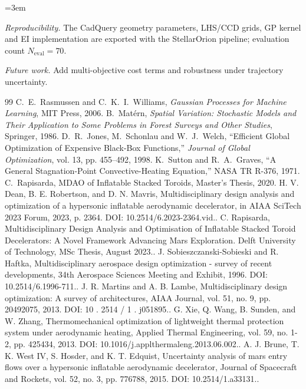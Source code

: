 \documentclass[10pt]{article}
\begin{document}
\begin{sloppypar} \emergencystretch=3em \raggedright
\noindent\textit{Reproducibility.} The CadQuery geometry parameters, LHS/CCD grids, GP kernel and EI implementation are exported with the StellarOrion pipeline; evaluation count $N_{\mathrm{eval}}=70$.\par\vspace{0.5em}
\noindent\textit{Future work.} Add multi-objective cost terms and robustness under trajectory uncertainty.\par\vspace{0.3em}
\begin{thebibliography}{99}
 C.~E.~Rasmussen and C.~K.~I.~Williams, \emph{Gaussian Processes for Machine Learning}, MIT Press, 2006.
 B.~Mat\'ern, \emph{Spatial Variation: Stochastic Models and Their Application to Some Problems in Forest Surveys and Other Studies}, Springer, 1986.
 D.~R.~Jones, M.~Schonlau and W.~J.~Welch, ``Efficient Global Optimization of Expensive Black-Box Functions,'' \emph{Journal of Global Optimization}, vol. 13, pp. 455--492, 1998.
 K.~Sutton and R.~A.~Graves, ``A General Stagnation-Point Convective-Heating Equation,'' NASA TR R-376, 1971.
 C.~Rapisarda, MDAO of Inflatable Stacked Toroids, Master's Thesis, 2020.
 H. V. Dean, B. E. Robertson, and D. N. Mavris, Multidisciplinary design analysis and optimization of a hypersonic inflatable aerodynamic decelerator, in AIAA SciTech 2023 Forum, 2023, p. 2364. DOI: 10.2514/6.2023-2364.vid..
 C. Rapisarda, Multidisciplinary Design Analysis and Optimisation of Inflatable Stacked Toroid Decelerators: A Novel Framework Advancing Mars Exploration. Delft University of Technology, MSc Thesis, August 2023..
 J. Sobieszczanski-Sobieski and R. Haftka, Multidisciplinary aerospace design optimization - survey of recent developments, 34th Aerospace Sciences Meeting and Exhibit, 1996. DOI: 10.2514/6.1996-711..
 J. R. Martins and A. B. Lambe, Multidisciplinary design optimization: A survey of architectures, AIAA Journal, vol. 51, no. 9, pp. 20492075, 2013. DOI: 10 . 2514 / 1 . j051895..
 G. Xie, Q. Wang, B. Sunden, and W. Zhang, Thermomechanical optimization of lightweight thermal protection system under aerodynamic heating, Applied Thermal Engineering, vol. 59, no. 1-2, pp. 425434, 2013. DOI: 10.1016/j.applthermaleng.2013.06.002..
 A. J. Brune, T. K. West IV, S. Hosder, and K. T. Edquist, Uncertainty analysis of mars entry flows over a hypersonic inflatable aerodynamic decelerator, Journal of Spacecraft and Rockets, vol. 52, no. 3, pp. 776788, 2015. DOI: 10.2514/1.a33131..

\end{thebibliography}
\end{sloppypar}
\end{document}
